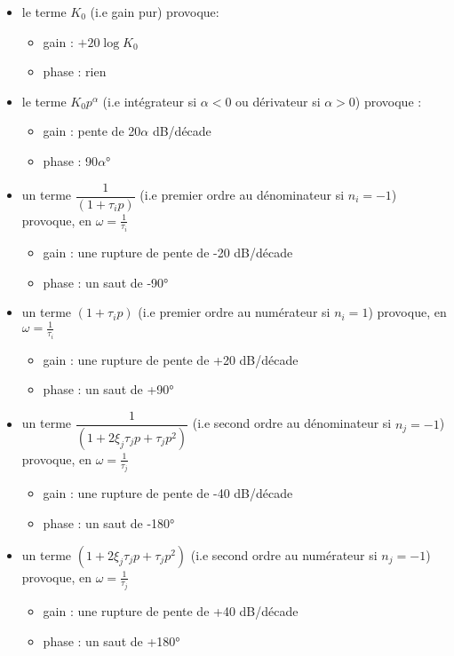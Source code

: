 \begin{itemize}
    \item le terme $K_0$ (i.e gain pur) provoque:
        \begin{itemize}
            \item gain  : $+20\log{K_0}$
            \item phase : rien 
        \end{itemize}
    \item le terme $K_0p^{\alpha}$ (i.e intégrateur si $\alpha<0$ ou dérivateur si $\alpha>0$)
        provoque :
        \begin{itemize}
            \item gain  : pente de 20$\alpha$ dB/décade 
            \item phase : 90$\alpha$\si{\degree}
        \end{itemize}
    \item un terme $\dfrac{1}{(1+\tau_ip)}$ (i.e premier ordre au dénominateur si $n_i=-1$) provoque, en $\omega=\frac{1}{\tau_i}$
        \begin{itemize}
            \item gain  : une rupture de pente de -20 dB/décade 
            \item phase : un saut de -90\si{\degree}
        \end{itemize}
    \item un terme $(1+\tau_ip)$ (i.e premier ordre au numérateur si $n_i=1$) provoque, en $\omega=\frac{1}{\tau_i}$
        \begin{itemize}
            \item gain  : une rupture de pente de +20 dB/décade 
            \item phase : un saut de +90\si{\degree}
        \end{itemize}
    \item un terme $\dfrac{1}{(1+2\xi_j\tau_jp+\tau_jp^2)}$ (i.e second ordre au dénominateur si $n_j=-1$) provoque, en $\omega=\frac{1}{\tau_j}$
        \begin{itemize}
            \item gain  : une rupture de pente de -40 dB/décade 
            \item phase : un saut de -180\si{\degree}
        \end{itemize}
    \item un terme $(1+2\xi_j\tau_jp+\tau_jp^2)$ (i.e second ordre au numérateur si $n_j=-1$) provoque, en $\omega=\frac{1}{\tau_j}$
        \begin{itemize}
            \item gain  : une rupture de pente de +40 dB/décade 
            \item phase : un saut de +180\si{\degree}
        \end{itemize}
\end{itemize}

